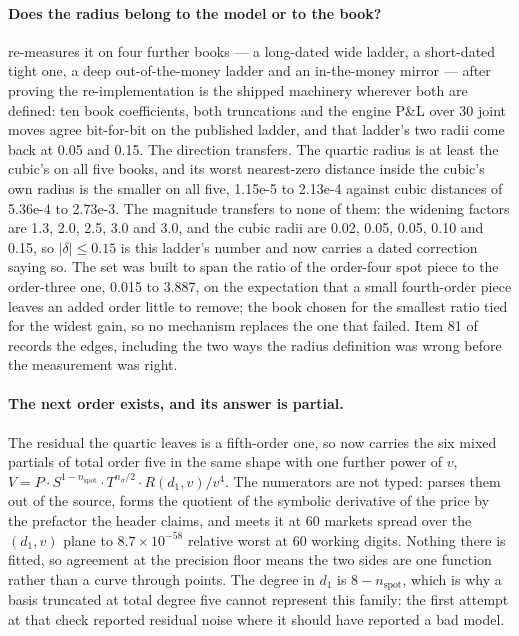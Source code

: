 \documentclass[11pt,a4paper]{article}
\begin{document}
\paragraph{Does the radius belong to the model or to the book?}
 re-measures it on four further books --- a
long-dated wide ladder, a short-dated tight one, a deep out-of-the-money ladder and an in-the-money
mirror --- after proving the re-implementation is the shipped machinery wherever both are defined: ten
book coefficients, both truncations and the engine P\&L over 30 joint moves agree bit-for-bit on the
published ladder, and that ladder's two radii come back at 0.05 and 0.15. The direction transfers. The
quartic radius is at least the cubic's on all five books, and its worst nearest-zero distance inside the
cubic's own radius is the smaller on all five, 1.15e-5 to 2.13e-4 against cubic distances of 5.36e-4 to
2.73e-3. The magnitude transfers to none of them: the widening factors are 1.3, 2.0, 2.5, 3.0 and 3.0,
and the cubic radii are 0.02, 0.05, 0.05, 0.10 and 0.15, so $|\delta| \le 0.15$ is this ladder's
number and  now carries a dated correction saying so. The set was
built to span the ratio of the order-four spot piece to the order-three one, 0.015 to 3.887, on the
expectation that a small fourth-order piece leaves an added order little to remove; the book chosen for
the smallest ratio tied for the widest gain, so no mechanism replaces the one that failed. Item 81 of
 records the edges, including the two ways the radius definition was wrong
before the measurement was right.

\paragraph{The next order exists, and its answer is partial.} The residual the quartic leaves is a
fifth-order one, so  now carries the six mixed
partials of total order five in the same shape with one further power of $v$,
$V = P \cdot S^{1-n_{\text{spot}}} \cdot T^{n_{\sigma}/2} \cdot R(d_1, v) / v^4$. The numerators are
not typed:  parses them out of the source, forms the
quotient of the symbolic derivative of the price by the prefactor the header claims, and meets it at 60
markets spread over the $(d_1, v)$ plane to $8.7 \times 10^{-58}$ relative worst at 60 working digits.
Nothing there is fitted, so agreement at the precision floor means the two sides are one function rather
than a curve through points. The degree in $d_1$ is $8 - n_{\text{spot}}$, which is why a basis truncated
at total degree five cannot represent this family: the first attempt at that check reported residual
noise where it should have reported a bad model.
\end{document}
